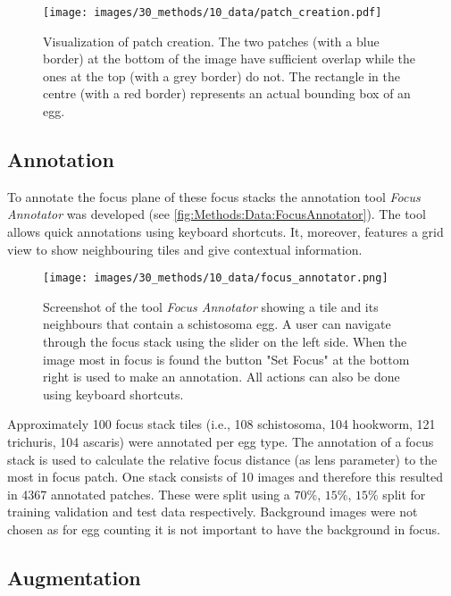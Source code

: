 \begin{figure}
    \centering
    \texttt{[image: images/30\_methods/10\_data/patch\_creation.pdf]}
    \caption[Patch creation]{Visualization of patch creation. The two patches (with a blue border) at the bottom of the image have sufficient overlap while the ones at the top (with a grey border) do not. The rectangle in the centre (with a red border) represents an actual bounding box of an egg.}
    \label{fig:Methods:Data:PatchCreation}
\end{figure}



\subsection{Annotation}
\label{sec:Methods:Data:Annotation}

To annotate the focus plane of these focus stacks the annotation tool \emph{Focus Annotator} \cite{kuchelmeister2022focus} was developed (see \autoref{fig:Methods:Data:FocusAnnotator}). The tool allows quick annotations using keyboard shortcuts. It, moreover, features a grid view to show neighbouring tiles and give contextual information.

\begin{figure}
    \centering
    \texttt{[image: images/30\_methods/10\_data/focus\_annotator.png]}
    \caption[Screenshot of Focus Annotator]{Screenshot of the tool \emph{Focus Annotator} showing a tile and its neighbours that contain a schistosoma egg. A user can navigate through the focus stack using the slider on the left side. When the image most in focus is found the button "Set Focus" at the bottom right is used to make an annotation. All actions can also be done using keyboard shortcuts.}
    \label{fig:Methods:Data:FocusAnnotator}
\end{figure}


Approximately 100 focus stack tiles (i.e., 108 schistosoma, 104 hookworm, 121 trichuris, 104 ascaris) were annotated per egg type. The annotation of a focus stack is used to calculate the relative focus distance (as lens parameter) to the most in focus patch. One stack consists of 10 images and therefore this resulted in 4367 annotated patches. These were split using a $70\%$, $15\%$, $15\%$ split for training validation and test data respectively. Background images were not chosen as for egg counting it is not important to have the background in focus.

\subsection{Augmentation}
\label{sec:Methods:Data:Augmentation}

